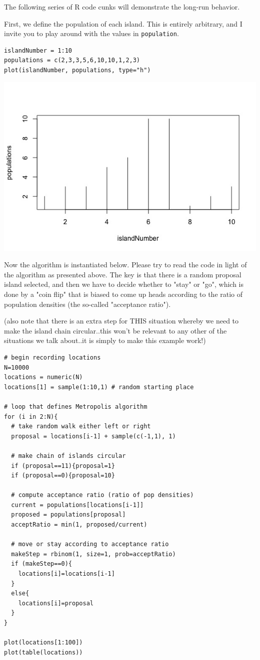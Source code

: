\documentclass[11pt]{article}
\begin{document}
The following series of R code cunks will demonstrate the long-run behavior.

First, we define the population of each island. This is entirely arbitrary, and I invite you to play around with the values in \texttt{population}.

\begin{verbatim}
islandNumber = 1:10
populations = c(2,3,3,5,6,10,10,1,2,3)
plot(islandNumber, populations, type="h")
\end{verbatim}

\includegraphics[width=.9\linewidth]{figures/week10/islandPop.jpeg}

Now the algorithm is instantiated below.  Please try to read the code in light of the algorithm as presented above.  The key is that there is a random proposal island selected, and then we have to decide whether to "stay" or "go", which is done by a "coin flip" that is biased to come up heads according to the ratio of population densities (the so-called "acceptance ratio").

(also note that there is an extra step for THIS situation whereby we need to make the island chain circular..this won't be relevant to any other of the situations we talk about..it is simply to make this example work!)

\begin{verbatim}
# begin recording locations
N=10000
locations = numeric(N)
locations[1] = sample(1:10,1) # random starting place

# loop that defines Metropolis algorithm
for (i in 2:N){
  # take random walk either left or right
  proposal = locations[i-1] + sample(c(-1,1), 1)
  
  # make chain of islands circular
  if (proposal==11){proposal=1}
  if (proposal==0){proposal=10}
  
  # compute acceptance ratio (ratio of pop densities)
  current = populations[locations[i-1]]
  proposed = populations[proposal]
  acceptRatio = min(1, proposed/current)
  
  # move or stay according to acceptance ratio
  makeStep = rbinom(1, size=1, prob=acceptRatio)
  if (makeStep==0){
    locations[i]=locations[i-1]
  }
  else{
    locations[i]=proposal
  }
}

plot(locations[1:100])
plot(table(locations))
\end{verbatim}
\end{document}
